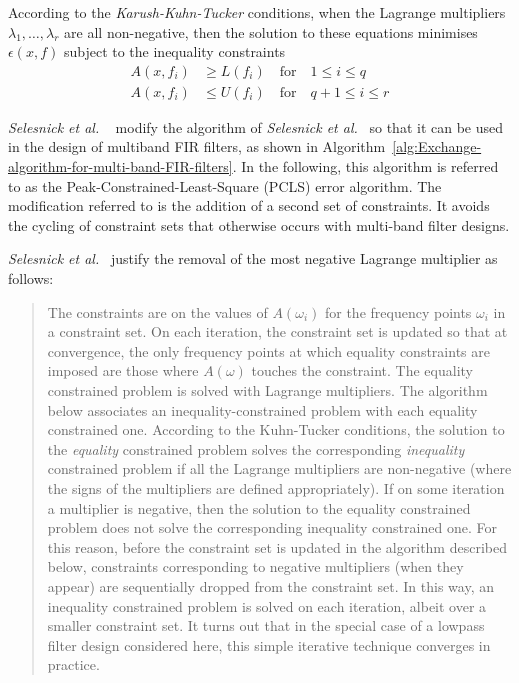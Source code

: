 \documentclass[a4paper,twoside,10pt,english]{report}
\begin{document}
According to the \emph{Karush-Kuhn-Tucker} conditions, when the Lagrange
multipliers $\lambda_{1},\ldots,\lambda_{r}$ are all non-negative,
then the solution to these equations minimises $\epsilon\left(x,f\right)$
subject to the inequality constraints 
\begin{align*}
A\left(x,f_{i}\right) & \ge L\left(f_{i}\right)\quad\text{for}\quad 1\le i\le q\\
A\left(x,f_{i}\right) & \le U\left(f_{i}\right)\quad\text{for}\quad q+1\le i\le r
\end{align*}

\emph{Selesnick et al.} 
~\cite[p.498]{SelesnickLangBurrus_ConstrainedLeastSquareMultiBandFIRFilters}
modify the algorithm of \emph{Selesnick et al.}~
\cite{SelesnickLangBurrus_ConstrainedLeastSquareFIRFilters}
so that it can be used in the design of multiband FIR filters, as
shown in Algorithm~\ref{alg:Exchange-algorithm-for-multi-band-FIR-filters}. 
In the following, this algorithm is referred to as the 
Peak-Constrained-Least-Square (PCLS) error algorithm. The modification referred
to is the addition of a second set of constraints. It avoids the cycling of 
constraint sets that otherwise occurs with multi-band filter designs.
 
\emph{Selesnick et al.}~
\cite[Section IV.A]{SelesnickLangBurrus_ConstrainedLeastSquareFIRFilters}
justify the removal of the most negative Lagrange multiplier as follows:

\begin{quotation}
The constraints are on the values of $A\left(\omega_{i}\right)$ for the 
frequency points $\omega_{i}$ in a constraint set. On each iteration, the
constraint set is updated so that at convergence, the only frequency points at
which equality constraints are imposed are those where $A\left(\omega\right)$
touches the constraint. The equality constrained problem is solved with Lagrange
multipliers. The algorithm below associates an inequality-constrained problem
with each equality constrained one. According to the Kuhn-Tucker conditions,
the solution to the \emph{equality} constrained problem solves the corresponding
\emph{inequality} constrained problem if all the Lagrange multipliers are
non-negative (where the signs of the multipliers are defined appropriately). If
on some iteration a multiplier is negative, then the solution to the 
equality constrained problem does not solve the corresponding inequality
constrained one. For this reason, before the constraint set is updated in the
algorithm described below, constraints corresponding to negative multipliers
(when they appear) are sequentially dropped from the constraint set. In this
way, an inequality constrained problem is solved on each iteration, albeit over
a smaller constraint set. It turns out that in the special case of a lowpass
filter design considered here, this simple iterative technique converges in
practice.
\end{quotation}
\end{document}
